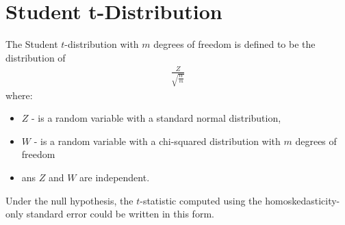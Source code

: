 \chapter{Student t-Distribution}
The Student $t$-distribution with $m$ degrees of freedom is defined to be the distribution of
\begin{eqnarray}
\frac{Z}{\sqrt{\frac{W}{m}}}
\end{eqnarray}
where:
\begin{itemize}
	\item $Z$ - is a random variable with a standard normal distribution,
	\item $W$ - is a random variable with a chi-squared distribution with $m$ degrees of freedom
	\item ans $Z$ and $W$ are independent.
\end{itemize}
Under the null hypothesis, the $t$-statistic computed using the homoskedasticity-only standard error could be written in this form. 
